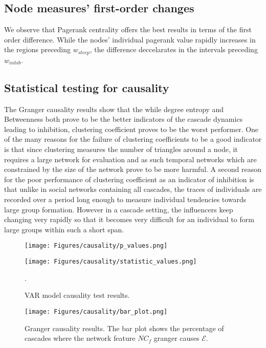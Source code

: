 \documentclass[smallextended]{svjour3}       %
\theoremstyle{definition}
\begin{document}
\subsection{Node measures' first-order changes}
We observe that Pagerank centrality offers the best results in terms of the first order difference. While the nodes' individual pagerank value rapidly increases in the regions preceding $w_{steep}$, the difference deccelarates in the intervals preceding $w_{inhib}$.   

\subsection{Statistical testing for causality}
The Granger causality results show that the while degree entropy and Betweenness both prove to be the better indicators of the cascade dynamics leading to inhibition, clustering coefficient proves to be the worst performer. One of the many reasons for the failure of clustering coefficients to be a good indicator is that since clustering measures the number of triangles around a node, it requires a large network for evaluation and as such temporal networks which are constrained by the size of the network prove to be more harmful. A second reason for the poor performance of clustering coefficient as an indicator of inhibition is that unlike in social networks containing all cascades, the traces of individuals are recorded over a period long enough to measure individual tendencies towards large group formation. However in a cascade setting, the influencers keep changing very rapidly so that it becomes very difficult for an individual to form large groups within such a short span.

\begin{figure}[!h]
	\centering
	\hfill
	\begin{minipage}{0.50\textwidth}%
		\texttt{[image: Figures/causality/p\_values.png]}
	\end{minipage}
	\hfill
	\begin{minipage}{0.40\textwidth}
		\texttt{[image: Figures/causality/statistic\_values.png]}
	\end{minipage}
	\hfill
	\caption{VAR model causality test results. }. 
\end{figure}

 \begin{figure}[!h]
	\centering
	\texttt{[image: Figures/causality/bar\_plot.png]}
	\caption{Granger causality results. The bar plot shows the percentage of cascades where the network feature $NC_f$ granger causes $\mathcal{E}$.}
	\label{fig:causality_plot}
\end{figure}
\end{document}
